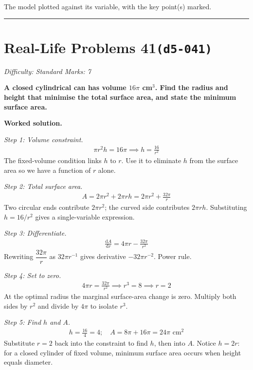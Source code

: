 \documentclass[11pt]{article}
\newcommand{\question}[1]{\par\medskip\noindent\textbf{#1}\par}
\begin{document}
\small The model plotted against its variable, with the key point(s) marked.\normalsize

\medskip\hrule

\section*{Real-Life Problems 41\quad\small\texttt{(d5-041)}}
\textit{Difficulty: Standard \quad\textbar\quad Marks: 7}

\question{A closed cylindrical can has volume \( 16\pi \) cm\(^3\). Find the radius and height that minimise the total surface area, and state the minimum surface area.}

\textbf{Worked solution.}

\textit{Step 1: Volume constraint.}
\[\begin{gathered}
\pi r^2 h = 16\pi \implies h = \frac{16}{r^2}
\end{gathered}\]
The fixed-volume condition links \( h \) to \( r \). Use it to eliminate \( h \) from the surface area so we have a function of \( r \) alone.

\textit{Step 2: Total surface area.}
\[\begin{gathered}
A = 2\pi r^2 + 2\pi r h = 2\pi r^2 + \frac{32\pi}{r}
\end{gathered}\]
Two circular ends contribute \( 2\pi r^2 \); the curved side contributes \( 2\pi r h \). Substituting \( h = 16/r^2 \) gives a single-variable expression.

\textit{Step 3: Differentiate.}
\[\begin{gathered}
\frac{\mathrm{d}A}{\mathrm{d}r} = 4\pi r - \frac{32\pi}{r^2}
\end{gathered}\]
Rewriting \( \dfrac{32\pi}{r} \) as \( 32\pi r^{-1} \) gives derivative \( -32\pi r^{-2} \). Power rule.

\textit{Step 4: Set to zero.}
\[\begin{gathered}
4\pi r = \frac{32\pi}{r^2} \implies r^3 = 8 \implies r = 2
\end{gathered}\]
At the optimal radius the marginal surface-area change is zero. Multiply both sides by \( r^2 \) and divide by \( 4\pi \) to isolate \( r^3 \).

\textit{Step 5: Find \( h \) and \( A \).}
\[\begin{gathered}
h = \frac{16}{4} = 4; \quad A = 8\pi + 16\pi = 24\pi \text{ cm}^2
\end{gathered}\]
Substitute \( r = 2 \) back into the constraint to find \( h \), then into \( A \). Notice \( h = 2r \): for a closed cylinder of fixed volume, minimum surface area occurs when height equals diameter.
\end{document}
